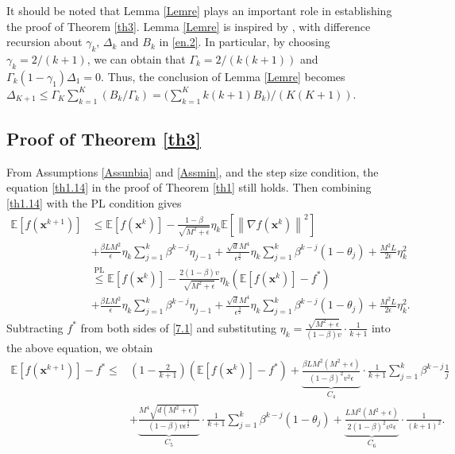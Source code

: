 \documentclass[twoside,11pt]{article}
\begin{document}
\begin{remark}\label{RMKLemre}
It should be noted that Lemma \ref{Lemre} plays an important role in establishing the proof of Theorem \ref{th3}. Lemma \ref{Lemre} is inspired by \citet[Lemma 1]{ghadimi2016accelerated}, with difference recursion about $\gamma_{k}$, $\Delta_{k}$ and $B_{k}$ in \eqref{en.2}. In particular, by choosing $\gamma_k={2}/{(k+1)}$, we can obtain that $\Gamma_k={2}/{(k(k+1))}$ and $\Gamma_k(1-\gamma_{1})\Delta_1=0$. Thus, the conclusion of Lemma \ref{Lemre} becomes $\Delta_{K+1}
\le\Gamma_K\sum_{k=1}^{K}
({B_k}/{\Gamma_k})=\big(\sum_{k=1}^{K}k(k+1){B_k}\big)/(K(K+1))$.
\end{remark}


\subsection{Proof of Theorem \ref{th3}}\label{Proof of th3}
From Assumptions \ref{Assunbia} and \ref{Assmin}, and the step size condition, the equation \eqref{th1.14} in the proof of Theorem \ref{th1} still holds. Then combining \eqref{th1.14} with the PL condition gives
\begin{equation}\label{7.1}
   	\begin{aligned}
   	\mathbb{E}\left[ f(\mathbf{x}^{k+1})\right] 
   	&{\le}
   	\mathbb{E}\left[ f(\mathbf{x}^k)\right] 
   	-\frac{1-\beta}{\sqrt{M^2+\epsilon}}\eta_k\mathbb{E}\left[\left\| \nabla f(\mathbf{x}^k)\right\|^2\right]\\
   	&{+}\frac{\beta L M^2}{\epsilon}\eta_k\sum_{j=1}^{k}\beta^{k-j} \eta_{j-1}
   	+\frac{\sqrt{d} M^4}{\epsilon^{\frac{3}{2}}}\eta_k\sum_{j=1}^{k}\beta^{k-j}(1-\theta_j)
   	+\frac{M^2L}{2\epsilon}\eta_k^2 \\
   	&{\overset{\text{PL}}{\le}}
   	\mathbb{E}\left[ f(\mathbf{x}^k)\right] 
   	-\frac{2(1-\beta)v}{\sqrt{M^2+\epsilon}}\eta_k\left( \mathbb{E}\left[ f(\mathbf{x}^k)\right] -f^*\right) \\
   	&{+}\frac{\beta LM^2}{\epsilon}
   	\eta_k\sum_{j=1}^{k}\beta^{k-j} \eta_{j-1}
   	+\frac{\sqrt{d} M^4}{\epsilon^{\frac{3}{2}}}\eta_k\sum_{j=1}^{k}\beta^{k-j}(1-\theta_j)
   	+\frac{M^2L}{2\epsilon}\eta_k^2.
   	\end{aligned}
\end{equation}
Subtracting $f^*$ from both sides of \eqref{7.1} and substituting $\eta_{k}=\frac{\sqrt{M^2+\epsilon}}{(1-\beta)v}\cdot\frac{1}{k+1}$ into the above equation, we obtain
\begin{equation}\label{th3.1}
   	\begin{aligned}
   	\mathbb{E}\left[ f(\mathbf{x}^{k+1})\right] -f^*
   	\le&\left( 1-\frac{2}{k+1}\right) \left( \mathbb{E}\left[ f(\mathbf{x}^k)\right] -f^*\right) 
   	+\underbrace{\frac{\beta LM^2(M^2+\epsilon)}{(1-\beta)^2 v^2\epsilon}}_{C_4}\cdot{\frac{1}{k+1}\sum_{j=1}^{k}\beta^{k-j} \frac{1}{j}}\\
   	&+\underbrace{\frac{M^4\sqrt{d\left( M^2+\epsilon\right)}  }{(1-\beta)v\epsilon^{\frac{3}{2}}}}_{C_5}\cdot{\frac{1}{k+1}\sum_{j=1}^{k}\beta^{k-j}(1-\theta_j)}
   	+\underbrace{{\frac{LM^2(M^2+\epsilon)}{2(1-\beta)^2 v^2\epsilon}}}_{C_6}\cdot{\frac{1}{(k+1)^2}}
   	.
   	\end{aligned}
\end{equation}
\end{document}
